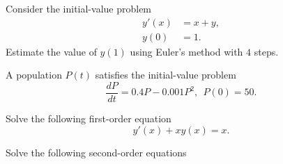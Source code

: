 \documentclass[11pt]{exam}
\begin{document}
\begin{questions}


\newpage
\addpoints
\question[4] Consider the initial-value problem
\begin{align*}
y'(x) & = x+y, \\
y(0) & = 1.
\end{align*}
Estimate the value of $y(1)$ using Euler's method with $4$ steps.  

\newpage

\addpoints
\question A population $P(t)$ satisfies the initial-value problem
\begin{equation*}
\frac{dP}{dt} = 0.4P - 0.001P^2, \ \ P(0)=50.
\end{equation*}
\newpage
\addpoints

\question[4]  Solve the following first-order equation
\begin{equation*}
y'(x)+xy(x)=x.
\end{equation*}
\addpoints 
\newpage

\question Solve the following second-order equations
\end{questions}
\end{document}
